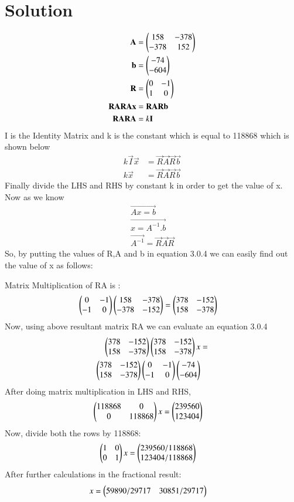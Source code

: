 \documentclass[journal,12pt,twocolumn]{IEEEtran}
\begin{document}
\section{Solution}
\begin{align}
\mathbf{A}&= \begin{pmatrix}158 & -378 \\ -378 & 152\end{pmatrix} \\
\mathbf{b}&= \begin{pmatrix}-74 \\ -604\end{pmatrix} \\
\mathbf{R}&= \begin{pmatrix}  0 & -1 \\ 1 & 0\end{pmatrix} \\
\mathbf{R}\mathbf{A}\mathbf{R}\mathbf{A}\mathbf{x}&= \mathbf{R}\mathbf{A}\mathbf{R}\mathbf{b} \\
\mathbf{R}\mathbf{A}\mathbf{R}\mathbf{A}&= k \mathbf{I} 
\end{align}
I is the Identity Matrix and k is the constant which is equal to 118868 which is shown below
\begin{align}
k\vec{I}\vec{x}&= \vec{R}\vec{A}\vec{R}\vec{b} \\
k\vec{x}&= \vec{R}\vec{A}\vec{R}\vec{b}
\end{align}
Finally divide the LHS and RHS by constant k in order to get the value of x.
Now as we know 
\begin{align}
\vec{Ax = b} \\
\vec{x = A^{-1} . b} \\
\vec{A^{-1}} = \vec{R}\vec{A}\vec{R} 
\end{align}
So, by putting the values of R,A and b in equation 3.0.4 we can easily find out the value of x as follows:

Matrix Multiplication of RA is :
\begin{align}
\begin{pmatrix}0 & -1 \\ -1 & 0\end{pmatrix}
\begin{pmatrix}158 & -378 \\ -378 & -152\end{pmatrix}&=
\begin{pmatrix}378 & -152 \\ 158 & -378\end{pmatrix}
\end{align}
Now, using above resultant matrix RA we can evaluate an equation 3.0.4
\begin{align}
\begin{pmatrix}378 & -152 \\ 158 & -378\end{pmatrix}
\begin{pmatrix}378 & -152 \\ 158 & -378\end{pmatrix}x&= \nonumber \\
\begin{pmatrix}378 & -152 \\ 158 & -378\end{pmatrix}
\begin{pmatrix}0 & -1 \\ -1 & 0\end{pmatrix}
\begin{pmatrix}-74 \\ -604\end{pmatrix}
\end{align}
After doing matrix multiplication in LHS and RHS,
\begin{align}
\begin{pmatrix}118868 & 0 \\ 0 & 118868\end{pmatrix}x&=
\begin{pmatrix}239560 \\ 123404\end{pmatrix}
\end{align}
Now, divide both the rows by 118868:
\begin{align}
\begin{pmatrix}1 & 0 \\ 0 & 1\end{pmatrix}x&=
\begin{pmatrix}239560/118868 \\ 123404/118868\end{pmatrix}
\end{align}
After further calculations in the fractional result:
\begin{align}
x&= \begin{pmatrix}59890/29717 & 30851/29717\end{pmatrix}
\end{align}
\end{document}
